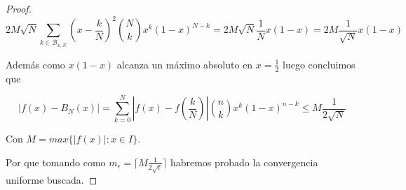 \begin{proof}
  \begin{equation}
    2M \sqrt{N} \sum_{k \in \mathcal{B}_{x,N}}  (x- \frac{k}{N})^2 \binom{N}{k} x^k (1-x) ^{N-k}  = 2M \sqrt{N} \frac{1}{N} x (1-x) = 2M  \frac{1}{\sqrt{N}} x (1-x)
  \end{equation}

  Además como $x (1-x)$ alcanza un máximo absoluto en $x=\frac{1}{2}$ luego concluimos que 

  \begin{equation}
    |f(x)-B_N(x)| = \sum_{k=0}^N \left| f(x) - f \left(\frac{k}{N} \right) \right| \binom{n}{k} x^k (1-x) ^{n-k} \leq M \frac{1}{2 \sqrt{N}} 
\end{equation}

    Con $M = max \{ |f(x)| : x \in I\}.$

    Por que tomando como $m_\epsilon = \lceil M \frac{1}{2 \sqrt{ \epsilon }} \rceil$
    habremos probado la convergencia uniforme buscada. 

\end{proof}

 
 
\endinput 


Sin pérdida de generalidad supondremos que $I=[0,1]$, como veremos esto no es restrictivo ya que 
si $I$ fuera un intervalo cerrado existiría un homeomorfismo $H$ tal que $H^*(I)=[0,1]$ y podríamos
trabajar con $H \circ f$ la cual respetaría todas los argumentos utilizados en la demostración. 

Si $I$ fuera un abierto consideraríamos su cierre y aplicaríamos el razonamiento anterior. 
De esta manera los supremos e ínfimos se mantendrían, ahora como mínimos y máximos y no se alteraría
de ninguna manera la continuidad. 

Tras la aclaración anterior podemos comenzar.

Fijado un $x$ del dominio, se tienen las siguientes particiones de índices: 
    
$$\mathcal{A}_{x,N} = \{ k | k \in \{1, ..., N\} \text{ y }  |x- \frac{k}{N}| < \delta_\varepsilon \}$$

Donde el $\delta_\varepsilon$ se ha obtenido de la observación 2 tomando como $\varepsilon$ el 
buscado para la convergencia uniforme. 

Sea $\varepsilon > 0$ y tomemos $\delta_ \varepsilon$ el delta de la definición de uniformemente continuo.

Por otro lado se define
$$\mathcal{B}_{x,N} = \{1, ..., N\} - \mathcal{A}_{x,N}$$


